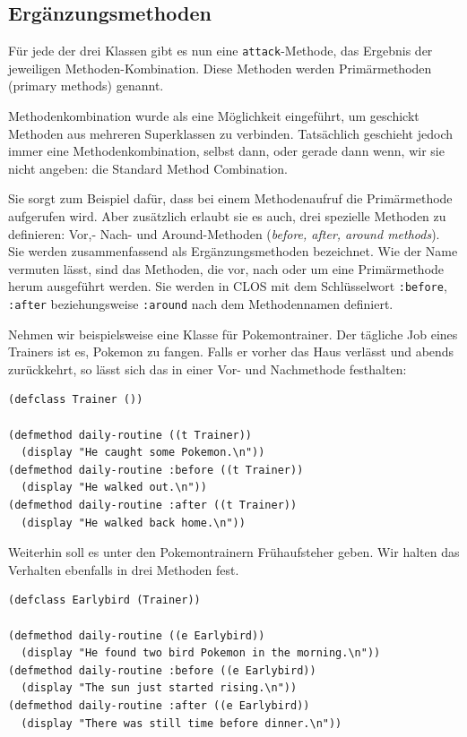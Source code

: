 \subsection{Ergänzungsmethoden}
\label{ergmeth}
Für jede der drei Klassen gibt es nun eine \texttt{attack}-Methode, das Ergebnis der jeweiligen Methoden-Kombination. Diese Methoden werden Primärmethoden (primary methods) genannt.

Methodenkombination wurde als eine Möglichkeit eingeführt, um geschickt Methoden aus mehreren Superklassen zu verbinden. Tatsächlich geschieht jedoch immer eine Methodenkombination, selbst dann, oder gerade dann wenn, wir sie nicht angeben: die Standard Method Combination.

Sie sorgt zum Beispiel dafür, dass bei einem Methodenaufruf die Primärmethode aufgerufen wird. Aber zusätzlich erlaubt sie es auch, drei spezielle Methoden zu definieren: Vor,- Nach- und Around-Methoden (\emph{before, after, around methods}). Sie werden zusammenfassend als Ergänzungsmethoden  bezeichnet. Wie der Name vermuten lässt, sind das Methoden, die vor, nach oder um eine Primärmethode herum ausgeführt werden. Sie werden in CLOS mit dem Schlüsselwort \texttt{:before}, \texttt{:after} beziehungsweise \texttt{:around} nach dem Methodennamen definiert.

Nehmen wir beispielsweise eine Klasse für Pokemontrainer. Der tägliche Job eines Trainers ist es, Pokemon zu fangen. Falls er vorher das Haus verlässt und abends zurückkehrt, so lässt sich das in einer Vor- und Nachmethode festhalten:

\begin{lstlisting}
(defclass Trainer ())

(defmethod daily-routine ((t Trainer))
  (display "He caught some Pokemon.\n"))
(defmethod daily-routine :before ((t Trainer))
  (display "He walked out.\n"))
(defmethod daily-routine :after ((t Trainer))
  (display "He walked back home.\n"))
\end{lstlisting}

Weiterhin soll es unter den Pokemontrainern Frühaufsteher geben. Wir halten das Verhalten ebenfalls in drei Methoden fest.

\begin{lstlisting}
(defclass Earlybird (Trainer))

(defmethod daily-routine ((e Earlybird))
  (display "He found two bird Pokemon in the morning.\n"))
(defmethod daily-routine :before ((e Earlybird))
  (display "The sun just started rising.\n"))
(defmethod daily-routine :after ((e Earlybird))
  (display "There was still time before dinner.\n"))
\end{lstlisting}

